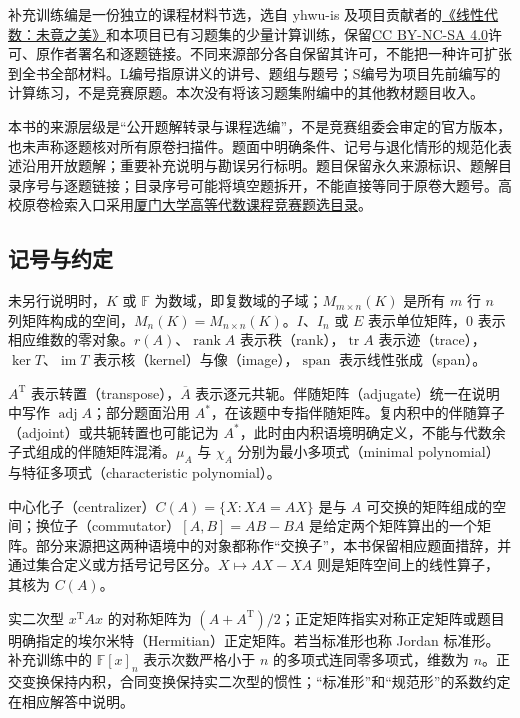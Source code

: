 \documentclass[12pt,fontset=fandol]{ctexart}
\begin{document}
补充训练编是一份独立的课程材料节选，选自 yhwu-is 及项目贡献者的\href{https://github.com/yhwu-is/Linear-Algebra-Left-Undone}{《线性代数：未竟之美》}和本项目已有习题集的少量计算训练，保留\href{https://creativecommons.org/licenses/by-nc-sa/4.0/}{CC BY-NC-SA 4.0}许可、原作者署名和逐题链接。不同来源部分各自保留其许可，不能把一种许可扩张到全书全部材料。L编号指原讲义的讲号、题组与题号；S编号为项目先前编写的计算练习，不是竞赛原题。本次没有将该习题集附编中的其他教材题目收入。

本书的来源层级是“公开题解转录与课程选编”，不是竞赛组委会审定的官方版本，也未声称逐题核对所有原卷扫描件。题面中明确条件、记号与退化情形的规范化表述沿用开放题解；重要补充说明与勘误另行标明。题目保留永久来源标识、题解目录序号与逐题链接；目录序号可能将填空题拆开，不能直接等同于原卷大题号。高校原卷检索入口采用\href{https://gdjpkc.xmu.edu.cn/DocumentList.aspx?cID=22&dID=383}{厦门大学高等代数课程竞赛题选目录}。

\subsection*{记号与约定}
未另行说明时，$K$ 或 $\mathbb F$ 为数域，即复数域的子域；$M_{m\times n}(K)$ 是所有 $m$ 行 $n$ 列矩阵构成的空间，$M_n(K)=M_{n\times n}(K)$。$I$、$I_n$ 或 $E$ 表示单位矩阵，$0$ 表示相应维数的零对象。$r(A)$、$\operatorname{rank}A$ 表示秩（rank），$\operatorname{tr}A$ 表示迹（trace），$\ker T$、$\operatorname{im}T$ 表示核（kernel）与像（image），$\operatorname{span}$ 表示线性张成（span）。

$A^{\mathrm T}$ 表示转置（transpose），$\overline A$ 表示逐元共轭。伴随矩阵（adjugate）统一在说明中写作 $\operatorname{adj}A$；部分题面沿用 $A^*$，在该题中专指伴随矩阵。复内积中的伴随算子（adjoint）或共轭转置也可能记为 $A^*$，此时由内积语境明确定义，不能与代数余子式组成的伴随矩阵混淆。$\mu_A$ 与 $\chi_A$ 分别为最小多项式（minimal polynomial）与特征多项式（characteristic polynomial）。

中心化子（centralizer）$C(A)=\{X:XA=AX\}$ 是与 $A$ 可交换的矩阵组成的空间；换位子（commutator）$[A,B]=AB-BA$ 是给定两个矩阵算出的一个矩阵。部分来源把这两种语境中的对象都称作“交换子”，本书保留相应题面措辞，并通过集合定义或方括号记号区分。$X\mapsto AX-XA$ 则是矩阵空间上的线性算子，其核为 $C(A)$。

实二次型 $x^{\mathrm T}Ax$ 的对称矩阵为 $(A+A^{\mathrm T})/2$；正定矩阵指实对称正定矩阵或题目明确指定的埃尔米特（Hermitian）正定矩阵。若当标准形也称 Jordan 标准形。补充训练中的 $\mathbb F[x]_n$ 表示次数严格小于 $n$ 的多项式连同零多项式，维数为 $n$。正交变换保持内积，合同变换保持实二次型的惯性；“标准形”和“规范形”的系数约定在相应解答中说明。
\tableofcontents
\clearpage
\end{document}

